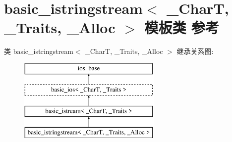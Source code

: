\hypertarget{classbasic__istringstream}{}\section{basic\+\_\+istringstream$<$ \+\_\+\+CharT, \+\_\+\+Traits, \+\_\+\+Alloc $>$ 模板类 参考}
\label{classbasic__istringstream}
类 basic\+\_\+istringstream$<$ \+\_\+\+CharT, \+\_\+\+Traits, \+\_\+\+Alloc $>$ 继承关系图\+:\begin{figure}[H]
\begin{center}
\leavevmode
\includegraphics[height=4.000000cm]{classbasic__istringstream}
\end{center}
\end{figure}
